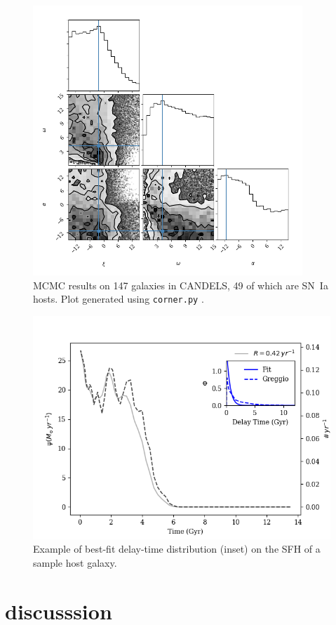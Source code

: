 \documentclass[apj]{aastex}
\begin{document}
\begin{figure}[t] %
   \centering
   \includegraphics[width=4in]{Figure_1} 
   \caption{\footnotesize MCMC results on 147 galaxies in CANDELS, 49 of which are SN~Ia hosts. Plot generated using {\tt corner.py} \citep{Foreman-Mackey:2016ve}.}
   \label{fig:fg1}
\end{figure}
\begin{figure}[h] %
   \centering
   \includegraphics[width=4.5in]{Figure_2} 
   \caption{\footnotesize Example of best-fit delay-time distribution (inset) on the SFH of a sample host galaxy. }
   \label{fig:fg2}
\end{figure}

\section{discusssion}
\end{document}
